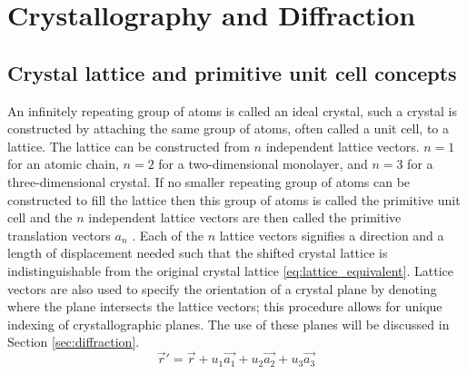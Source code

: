 \section{Crystallography and Diffraction}

\subsection{Crystal lattice and primitive unit cell concepts}
An infinitely repeating group of atoms is called an ideal crystal, such a crystal is constructed by attaching the same group of atoms, often called a unit cell, to a lattice.
The lattice can be constructed from $n$ independent lattice vectors. $n=1$ for an atomic chain, $n=2$ for a two-dimensional monolayer, and $n=3$ for a three-dimensional crystal.
If no smaller repeating group of atoms can be constructed to fill the lattice then this group of atoms is called the primitive unit cell and the $n$ independent lattice vectors are then called the primitive translation vectors $a_{n}$ \cite{Kittel1995-qt}.
Each of the $n$ lattice vectors signifies a direction and a length of displacement needed such that the shifted crystal lattice is indistinguishable from the original crystal lattice \ref{eq:lattice_equivalent}.
Lattice vectors are also used to specify the orientation of a crystal plane by denoting where the plane intersects the lattice vectors; this procedure allows for unique indexing of crystallographic planes. The use of these planes will be discussed in Section \ref{sec:diffraction}.
\begin{equation}
    \vec{r}' = \vec{r} + u_1 \vec{a_1} +u_2 \vec{a_2} + u_3 \vec{a_3}
    \label{eq:lattice_equivalent}
\end{equation}


